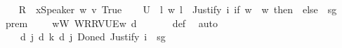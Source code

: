 \begin{isabellebody}
\ \ \isamarkupfalse%
\ {\isacharquery}{\kern0pt}R\ {\isacharequal}{\kern0pt}\ {\isachardoublequoteopen}{\isasymlambda}{\isacharparenleft}{\kern0pt}x{\isacharcolon}{\kern0pt}{\isacharcolon}{\kern0pt}Speaker{\isacharparenright}{\kern0pt}\ {\isacharparenleft}{\kern0pt}w{\isacharcolon}{\kern0pt}{\isacharcolon}{\kern0pt}{\isasymw}{\isacharparenright}{\kern0pt}\ {\isacharparenleft}{\kern0pt}v{\isacharcolon}{\kern0pt}{\isacharcolon}{\kern0pt}{\isasymw}{\isacharparenright}{\kern0pt}{\isachardot}{\kern0pt}\ True{\isachardoublequoteclose}\isanewline
\ \ \isamarkupfalse%
\ {\isacharquery}{\kern0pt}U\ {\isacharequal}{\kern0pt}\ {\isachardoublequoteopen}{\isasymlambda}l\ w{\isachardot}{\kern0pt}\ l\ {\isacharequal}{\kern0pt}\ Justify\ i\ {\isacharparenleft}{\kern0pt}if\ w\ {\isacharequal}{\kern0pt}\ w\ then\ {\isasymphi}\ else\ {\isasymphi}\ sg\ {\isasymphi}{\isachardoublequoteclose}\isanewline
\ \ \isamarkupfalse%
\ prem{\isacharcolon}{\kern0pt}\ {\isachardoublequoteopen}{\isasymforall}{\isasymgamma}{\isachardot}{\kern0pt}\ {\isasymGamma}\ {\isasymgamma}\ {\isasymlongrightarrow}\ {\isacharparenleft}{\kern0pt}{\isasymforall}w{\isacharcolon}{\kern0pt}{\isacharquery}{\kern0pt}W{\isachardot}{\kern0pt}\ {\isasymlangle}{\isacharquery}{\kern0pt}W{\isacharcomma}{\kern0pt}{\isacharquery}{\kern0pt}R{\isacharcomma}{\kern0pt}{\isacharquery}{\kern0pt}R{\isacharcomma}{\kern0pt}V{\isacharcomma}{\kern0pt}{\isacharquery}{\kern0pt}U{\isacharcomma}{\kern0pt}E{\isasymrangle}{\isacharcomma}{\kern0pt}w\ {\isasymTurnstile}\isactrlsup d\ {\isasymgamma}{\isacharparenright}{\kern0pt}{\isachardoublequoteclose}\isanewline
\ \ \ \ \isamarkupfalse%
\ {\isasymGamma}{\isacharunderscore}{\kern0pt}def\ \isamarkupfalse%
\ auto\isanewline
\ \ \isamarkupfalse%
\ {\isachardoublequoteopen}{\isasymnot}{\isacharparenleft}{\kern0pt}{\isasymexists}{\isasymDelta}{\isachardot}{\kern0pt}\ {\isasymGamma}\ {\isasymTurnstile}\ {\isasymD}\isactrlsup d\ j\ {\isacharparenleft}{\kern0pt}{\isasymB}\isactrlsup d\ k\ {\isacharparenleft}{\kern0pt}{\isasymD}\isactrlsup d\ j\ {\isacharparenleft}{\kern0pt}Done\isactrlsup d\ {\isacharparenleft}{\kern0pt}Justify\ i\ {\isasymDelta}\ sg\ {\isasymphi}{\isacharparenright}{\kern0pt}{\isacharparenright}{\kern0pt}{\isacharparenright}{\kern0pt}{\isacharparenright}{\kern0pt}{\isacharparenright}{\kern0pt}{\isachardoublequoteclose}\isanewline
\ \ \isamarkupfalse%

\end{isabellebody}
